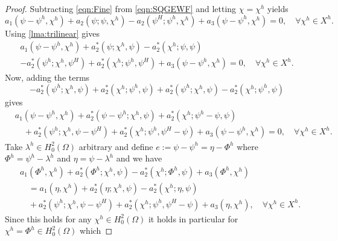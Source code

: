 \begin{proof}
  Subtracting \eqref{eqn:Fine} from \eqref{eqn:SQGEWF} and letting $\chi=\chi^h$ yields
  \begin{equation*}
    a_1(\psi - \psi^h,\chi^h) + a_2(\psi;\psi,\chi^h) - a_2(\psi^H;\psi^h,\chi^h)
      + a_3(\psi-\psi^h,\chi^h) = 0, \quad \forall \chi^h \in X^h.
  \end{equation*}
  Using \autoref{lma:trilinear} gives
  \begin{equation*}
    \begin{split}
      a_1(\psi - \psi^h,\chi^h)
        + a_2^*(\psi;\chi^h, \psi) - a_2^*(\chi^h;\psi,\psi) \\
      - a_2^*(\psi^h;\chi^h,\psi^H) + a_2^*(\chi^h; \psi^h,\psi^H)
        + a_3(\psi-\psi^h,\chi^h) = 0, \quad \forall \chi^h \in X^h.
    \end{split}
  \end{equation*}
  Now, adding the terms
  \begin{equation*}
    -a_2^*(\psi^h;\chi^h,\psi) + a_2^*(\chi^h;\psi^h,\psi) + a_2^*(\psi^h;\chi^h,\psi) - a_2^*(\chi^h;\psi^h,\psi)
  \end{equation*}
  gives
  \begin{equation*}
    \begin{split}
      &a_1(\psi - \psi^h,\chi^h)
        + a_2^*(\psi-\psi^h;\chi^h, \psi) + a_2^*(\chi^h;\psi^h-\psi,\psi) \\
      &\quad+ a_2^*(\psi^h;\chi^h,\psi-\psi^H) + a_2^*(\chi^h; \psi^h,\psi^H-\psi)
        + a_3(\psi-\psi^h,\chi^h) = 0, \quad \forall \chi^h \in X^h.
    \end{split}
  \end{equation*}
  Take $\lambda^h\in H^2_0(\Omega)$ arbitrary and define $e:= \psi - \psi^h = \eta - \Phi^h$ where
  $\Phi^h = \psi^h-\lambda^h$ and $\eta=\psi-\lambda^h$ and we have
  \begin{equation*}
    \begin{split}
      &a_1(\Phi^h,\chi^h)
        + a_2^*(\Phi^h;\chi^h, \psi) - a_2^*(\chi^h;\Phi^h,\psi)
        + a_3(\Phi^h,\chi^h) \\
      &\quad = a_1(\eta,\chi^h)
        + a_2^*(\eta;\chi^h, \psi) - a_2^*(\chi^h;\eta,\psi) \\
      &\quad+ a_2^*(\psi^h;\chi^h,\psi-\psi^H) + a_2^*(\chi^h; \psi^h,\psi^H-\psi)
        + a_3(\eta,\chi^h), \quad \forall \chi^h \in X^h.
    \end{split}
  \end{equation*}
  Since this holds for any $\chi^h\in H^2_0(\Omega)$ it holds in particular for $\chi^h=\Phi^h\in H^2_0(\Omega)$ which

\end{proof}
